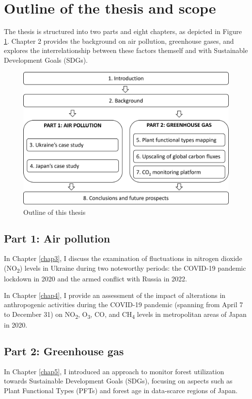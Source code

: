 \section{Outline of the thesis and scope}

The thesis is structured into two parts and eight chapters, as depicted in Figure \ref{fig:chap1_fig2}. Chapter 2 provides the background on air pollution, greenhouse gases, and explores the interrelationship between these factors themself and with Sustainable Development Goals (SDGs). \par
\begin{figure}[tbh!]
    \centering
    \includegraphics[width=\textwidth]{figs/chap1/outline.png}
    \caption{Outline of this thesis}
    \label{fig:chap1_fig2}
\end{figure}
\subsection*{Part 1: Air pollution}

In Chapter \ref{chap3}, I discuss the examination of fluctuations in nitrogen dioxide (NO\textsubscript{2}) levels in Ukraine during two noteworthy periods: the COVID-19 pandemic lockdown in 2020 and the armed conflict with Russia in 2022.\par

In Chapter \ref{chap4}, I provide an assessment of the impact of alterations in anthropogenic activities during the COVID-19 pandemic (spanning from April 7 to December 31) on NO\textsubscript{2}, O\textsubscript{3}, CO, and CH\textsubscript{4} levels in metropolitan areas of Japan in 2020. \par
\subsection*{Part 2: Greenhouse gas}
In Chapter \ref{chap5}, I introduced an approach to monitor forest utilization towards Sustainable Development Goals (SDGs), focusing on aspects such as Plant Functional Types (PFTs) and forest age in data-scarce regions of Japan. \par

